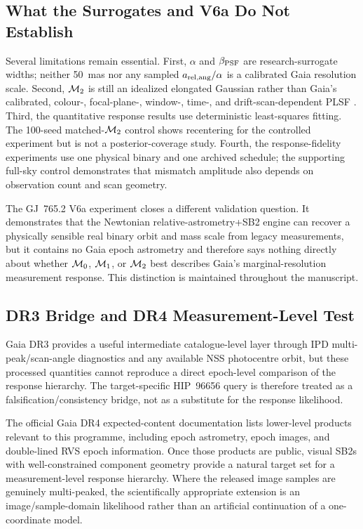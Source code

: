 \subsection{What the Surrogates and V6a Do Not Establish}

Several limitations remain essential. First, $\alpha$ and $\beta_{\rm PSF}$ are research-surrogate widths; neither 50~mas nor any sampled $a_{\rm rel,ang}/\alpha$ is a calibrated Gaia resolution scale. Second, $\mathcal{M}_2$ is still an idealized elongated Gaussian rather than Gaia's calibrated, colour-, focal-plane-, window-, time-, and drift-scan-dependent PLSF \citep{Rowell2021,Rowell2026}. Third, the quantitative response results use deterministic least-squares fitting. The 100-seed matched-$\mathcal{M}_2$ control shows recentering for the controlled experiment but is not a posterior-coverage study. Fourth, the response-fidelity experiments use one physical binary and one archived schedule; the supporting full-sky control demonstrates that mismatch amplitude also depends on observation count and scan geometry.

The GJ~765.2 V6a experiment closes a different validation question. It demonstrates that the Newtonian relative-astrometry+SB2 engine can recover a physically sensible real binary orbit and mass scale from legacy measurements, but it contains no Gaia epoch astrometry and therefore says nothing directly about whether $\mathcal{M}_0$, $\mathcal{M}_1$, or $\mathcal{M}_2$ best describes Gaia's marginal-resolution measurement response. This distinction is maintained throughout the manuscript.

\subsection{DR3 Bridge and DR4 Measurement-Level Test}

Gaia DR3 provides a useful intermediate catalogue-level layer through IPD multi-peak/scan-angle diagnostics and any available NSS photocentre orbit, but these processed quantities cannot reproduce a direct epoch-level comparison of the response hierarchy. The target-specific HIP~96656 query is therefore treated as a falsification/consistency bridge, not as a substitute for the response likelihood.

The official Gaia DR4 expected-content documentation lists lower-level products relevant to this programme, including epoch astrometry, epoch images, and double-lined RVS epoch information. Once those products are public, visual SB2s with well-constrained component geometry provide a natural target set for a measurement-level response hierarchy. Where the released image samples are genuinely multi-peaked, the scientifically appropriate extension is an image/sample-domain likelihood rather than an artificial continuation of a one-coordinate model.

